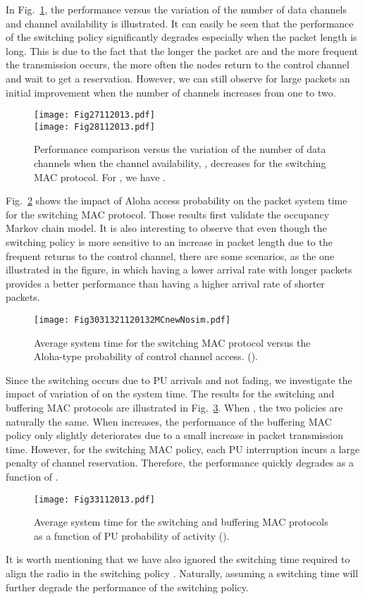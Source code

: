 \documentclass[12pt,journal,oneside,onecolumn]{IEEEtran}
\begin{document}
In Fig.~\ref{Fig2728112013}, the performance versus 
the variation of the number of data channels and channel availability 
is illustrated. It can easily be 
seen that the performance of the switching policy 
significantly degrades especially when the packet length 
is long. This is due to the fact that the longer the packet are and the more frequent the transmission
occurs, the more often the nodes return to the control channel and wait to get a reservation.
However, we can still observe for large packets  an initial 
improvement when the number of channels increases 
from one to two.
\begin{figure}\centering
\texttt{[image: Fig27112013.pdf]}\\
\texttt{[image: Fig28112013.pdf]}\caption{Performance comparison versus the variation of the number of data channels  when the channel availability, , decreases for the switching MAC protocol.
For , we have .}\label{Fig2728112013}
\end{figure}

Fig.~\ref{Fig303132112013.pdf}  shows the impact of Aloha access probability on the packet system time 
for the switching MAC protocol. Those results first
validate the occupancy Markov chain model.
It is also interesting to observe that even though the switching policy 
is more sensitive to an increase in packet length due to the frequent returns to the control channel, 
there are some scenarios, as the one illustrated in the figure, in which having a lower arrival rate with longer packets provides
a better performance than having a higher arrival rate of shorter packets. 
\begin{figure}\texttt{[image: Fig3031321120132MCnewNosim.pdf]}\caption{Average system time for the switching MAC protocol versus the Aloha-type probability of control channel access. ().}\label{Fig303132112013.pdf}\end{figure}







Since the switching occurs due to PU arrivals and not fading, 
we investigate the impact of variation of  on the system time. The results for the switching and buffering MAC protocols are 
illustrated in Fig.~\ref{Fig33112013.pdf}. When , the two policies 
are naturally the same. When  increases, the performance of the buffering MAC policy
only slightly deteriorates due to a small increase in packet transmission time. However, for the switching
MAC policy, each PU interruption incurs a large penalty of channel reservation. Therefore, the performance
quickly degrades as a function of .
\begin{figure}\centering
\texttt{[image: Fig33112013.pdf]}\caption{Average system time for the switching and buffering MAC protocols as a function of PU probability of activity ().}\label{Fig33112013.pdf}\end{figure}
It is worth mentioning that we have also ignored the switching time required 
to align the radio in the switching policy \cite{park11}. Naturally, 
assuming a switching time will further degrade the 
performance of the switching policy.
\end{document}
